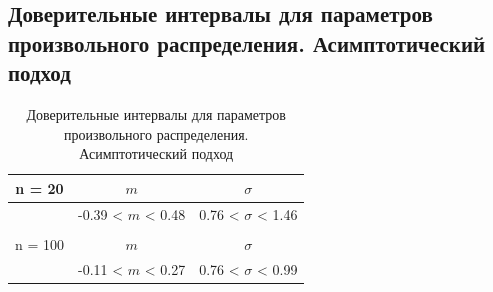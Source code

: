 \subsection{Доверительные интервалы для параметров произвольного распределения. Асимптотический подход}
	\begin{table}[H]
	    \centering
	    \begin{tabular}{| c | c | c |}
	    \hline
	       n = 20   &  $m$  & $\sigma$\\ \hline
	          &  -0.39 < $m$ < 0.48 & 0.76 < $\sigma$ < 1.46 \\ \hline
	         &   &   \\ \hline
	       n = 100   &  $m$  & $\sigma$\\ \hline
	        & -0.11 < $m$ < 0.27 & 0.76 < $\sigma$ < 0.99 \\
	   \hline
	    \end{tabular}
	    \caption{Доверительные интервалы для параметров произвольного распределения. Асимптотический подход}
	    \label{tab:interv_asimpt}
	\end{table}
	